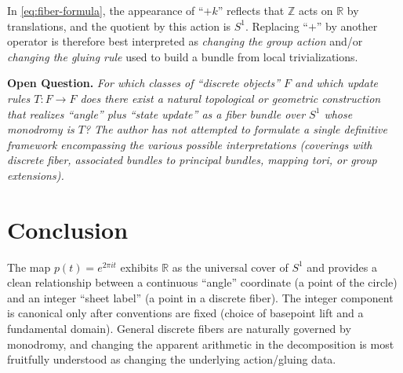 \documentclass[11pt,a4paper]{article}
\theoremstyle{definition}
\theoremstyle{remark}
\newenvironment{openquestion}{\par\textbf{Open Question.}\itshape}{\par}
\begin{document}
In \cref{eq:fiber-formula}, the appearance of ``\(+k\)'' reflects that \(\mathbb{Z}\) acts on \(\mathbb{R}\) by translations, and the quotient by this action is \(S^{1}\). Replacing ``\(+\)'' by another operator is therefore best interpreted as \emph{changing the group action} and/or \emph{changing the gluing rule} used to build a bundle from local trivializations.

\begin{openquestion}
\label{oq:other-operators}
For which classes of ``discrete objects'' \(F\) and which update rules \(T:F\to F\) does there exist a natural topological or geometric construction that realizes ``angle'' plus ``state update'' as a fiber bundle over \(S^{1}\) whose monodromy is \(T\)? The author has not attempted to formulate a single definitive framework encompassing the various possible interpretations (coverings with discrete fiber, associated bundles to principal bundles, mapping tori, or group extensions).
\end{openquestion}

\section{Conclusion}
\label{sec:conclusion}

The map \(p(t)=e^{2\pi i t}\) exhibits \(\mathbb{R}\) as the universal cover of \(S^{1}\) and provides a clean relationship between a continuous ``angle'' coordinate (a point of the circle) and an integer ``sheet label'' (a point in a discrete fiber). The integer component is canonical only after conventions are fixed (choice of basepoint lift and a fundamental domain). General discrete fibers are naturally governed by monodromy, and changing the apparent arithmetic in the decomposition is most fruitfully understood as changing the underlying action/gluing data.



\end{document}
